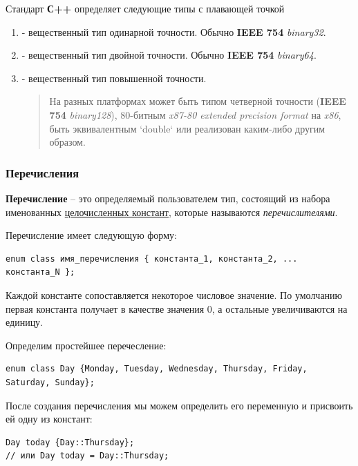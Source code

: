 Стандарт \textbf{С++} определяет следующие типы с плавающей точкой
\begin{enumerate}
    \item {} - вещественный тип одинарной точности. Обычно
          \textbf{IEEE 754} \emph{binary32}.
    \item {} - вещественный тип
          двойной точности. Обычно \textbf{IEEE 754} \emph{binary64}.
    \item {} - вещественный тип повышенной точности.
          \begin{quote}
              На разных платформах может быть типом четверной точности (\textbf{IEEE 754} \textit{binary128}), 80-битным \textit{x87-80 extended precision format} на \textit{x86}, быть эквивалентным `double` или реализован каким-либо другим образом.
          \end{quote}
\end{enumerate}

\subsubsection{Перечисления}

\textbf{Перечисление} -- это определяемый пользователем тип, состоящий из набора именованных \underline{целочисленных констант}, которые называются \textit{перечислителями}.

\vspace{\baselineskip}

Перечисление имеет следующую форму:
\begin{verbatim}
enum class имя_перечисления { константа_1, константа_2, ... константа_N };
\end{verbatim}

Каждой константе сопоставляется некоторое числовое значение. По умолчанию первая константа получает в качестве значения 0, а остальные увеличиваются на единицу.

\vspace{\baselineskip}

Определим простейшее перечесление:
\begin{verbatim}
enum class Day {Monday, Tuesday, Wednesday, Thursday, Friday, Saturday, Sunday};
\end{verbatim}

После создания перечисления мы можем определить его переменную и присвоить ей одну из констант:

\begin{verbatim}
Day today {Day::Thursday};
// или Day today = Day::Thursday;
\end{verbatim}

